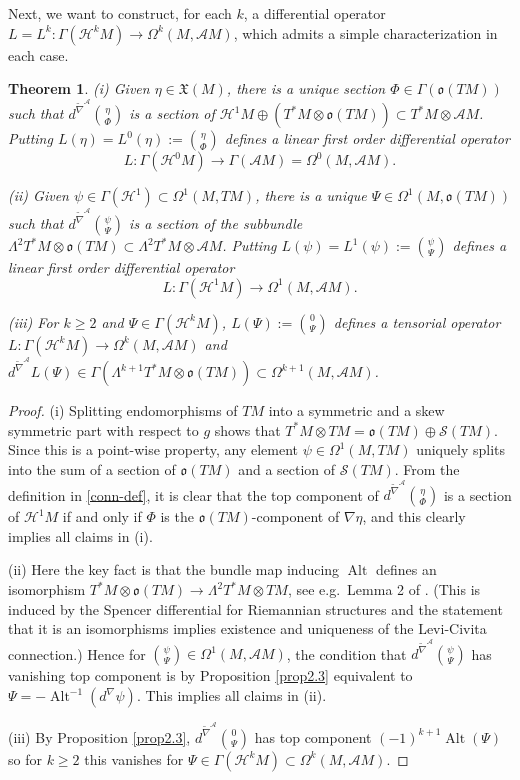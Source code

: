 \documentclass[12pt,a4paper]{amsart}
\def\frak{\mathfrak}
\def\Cal{\mathcal}
\newcommand{\ps}{\psi}
\newcommand{\Ga}{\Gamma}
\newcommand{\La}{\Lambda}
\newcommand{\Om}{\Omega}
\newcommand{\Alt}{\operatorname{Alt}}
\newcommand{\tn}{\widetilde{\nabla}}
\newcounter{theorem}
\numberwithin{theorem}{section}
\numberwithin{equation}{section}
\newtheorem{thm}[theorem]{Theorem}
\theoremstyle{definition}
\theoremstyle{remark}
\begin{document}
Next, we want to construct, for each $k$, a differential operator $L=L^k:\Ga(\Cal
H^kM)\to\Om^k(M,\Cal AM)$, which admits a simple characterization in each case.
\begin{thm}\label{thm2.4}
(i) Given $\eta\in\frak X(M)$, there is a unique section $\Phi\in\Ga(\frak o(TM))$
  such that $d^{\tn^{\Cal A}}\binom{\eta}{\Phi}$ is a section of $\Cal H^1M\oplus
  (T^*M\otimes\frak o(TM))\subset T^*M\otimes\Cal AM$. Putting
  $L(\eta)=L^0(\eta):=\binom{\eta}{\Phi}$ defines a linear first order differential
  operator
  $$L:\Ga(\Cal H^0M)\to\Ga(\Cal AM)=\Om^0(M,\Cal AM).$$

(ii) Given $\psi\in\Ga(\Cal H^1)\subset\Om^1(M,TM)$, there is a unique
  $\Psi\in\Om^1(M,\frak o(TM))$ such that $d^{\tn^{\Cal A}}\binom{\ps}{\Psi}$ is a
  section of the subbundle $\La^2T^*M\otimes\frak o(TM)\subset\La^2T^*M\otimes\Cal
  AM$. Putting $L(\psi)=L^1(\psi):=\binom{\psi}{\Psi}$ defines a linear first order
  differential operator $$L:\Ga(\Cal H^1M)\to\Om^1(M,\Cal AM).$$

  (iii) For $k\geq 2$ and $\Psi\in\Ga(\Cal H^kM)$, $L(\Psi):=\binom0{\Psi}$ defines a
  tensorial operator $L:\Ga(\Cal H^kM)\to\Om^k(M,\Cal AM)$ and
  $d^{\tn^{\Cal A}}L(\Psi)\in\Ga(\La^{k+1}T^*M\otimes\frak
  o(TM))\subset\Om^{k+1}(M,\Cal AM)$.
\end{thm}
\begin{proof}
(i) Splitting endomorphisms of $TM$ into a symmetric and a skew symmetric part with
  respect to $g$ shows that $T^*M\otimes TM=\frak o(TM)\oplus\Cal S(TM)$. Since this
  is a point-wise property, any element $\psi\in\Om^1(M,TM)$ uniquely splits into the
  sum of a section of $\frak o(TM)$ and a section of $\Cal S(TM)$. From the
  definition in \eqref{conn-def}, it is clear that the top component of $d^{\tn^{\Cal
      A}}\binom{\eta}{\Phi}$ is a section of $\Cal H^1M$ if and only if $\Phi$ is the
  $\frak o(TM)$-component of $\nabla\eta$, and this clearly implies all claims in
  (i).

(ii) Here the key fact is that the bundle map inducing $\Alt$ defines an isomorphism
  $T^*M\otimes\frak o(TM)\to\La^2T^*M\otimes TM$, see e.g.\ Lemma 2 of
  \cite{Arnold-Hu}. (This is induced by the Spencer differential for Riemannian
  structures and the statement that it is an isomorphisms implies existence and
  uniqueness of the Levi-Civita connection.) Hence for
  $\binom{\psi}{\Psi}\in\Om^1(M,\Cal AM)$, the condition that $d^{\tn^{\Cal
      A}}\binom{\psi}{\Psi}$ has vanishing top component is by Proposition
  \ref{prop2.3} equivalent to $\Psi=-\Alt^{-1}(d^\nabla\psi)$. This implies all
  claims in (ii).

  (iii) By Proposition \ref{prop2.3}, $d^{\tn^{\Cal A}}\binom{0}{\Psi}$ has top
  component $(-1)^{k+1}\Alt(\Psi)$ so for $k\geq 2$ this vanishes for
  $\Psi\in\Ga(\Cal H^kM)\subset\Om^k(M,\Cal AM)$.
\end{proof}
\end{document}
